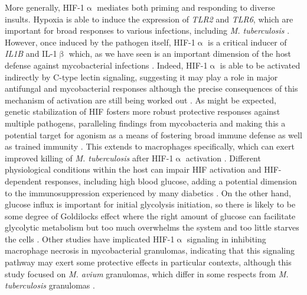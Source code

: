 More generally, HIF\hyp{}1$\upalpha$ mediates both priming and responding to diverse insults. Hypoxia is able to induce the expression of \textit{TLR2} and \textit{TLR6}, which are important for broad responses to various infections, including \textit{M. tuberculosis} \citep{Kuhlicke2007}. However, once induced by the pathogen itself, HIF\hyp{}1$\upalpha$ is a critical inducer of \textit{IL1B} and IL\hyp{}1$\upbeta$ which, as we have seen is an important dimension of the host defense against mycobacterial infections \citep{Ogryzko2019}. Indeed, HIF\hyp{}1$\upalpha$ is able to be activated indirectly by C\hyp{}type lectin signaling, suggesting it may play a role in major antifungal and mycobacterial responses although the precise consequences of this mechanism of activation are still being worked out \citep{Elder2019, Friedrich2017}. As might be expected, genetic stabilization of HIF fosters more robust protective responses against multiple pathogens, paralleling findings from mycobacteria and making this a potential target for agonism as a means of fostering broad immune defense as well as trained immunity \citep{Schild2020}. This extends to macrophages specifically, which can exert improved killing of \textit{M. tuberculosis} after HIF\hyp{}1$\upalpha$ activation \citep{Li2021}. Different physiological conditions within the host can impair HIF activation and HIF\hyp{}dependent responses, including high blood glucose, adding a potential dimension to the immunosuppression experienced by many diabetics \citep{Teran2022}. On the other hand, glucose influx is important for initial glycolysis initiation, so there is likely to be some degree of Goldilocks effect where the right amount of glucose can facilitate glycolytic metabolism but too much overwhelms the system and too little starves the cells \citep{Stunault2018}. Other studies have implicated HIF\hyp{}1$\upalpha$ signaling in inhibiting macrophage necrosis in mycobacterial granulomas, indicating that this signaling pathway may exert some protective effects in particular contexts, although this study focused on \textit{M. avium} granulomas, which differ in some respects from \textit{M. tuberculosis} granulomas \citep{Cardoso2015}.


